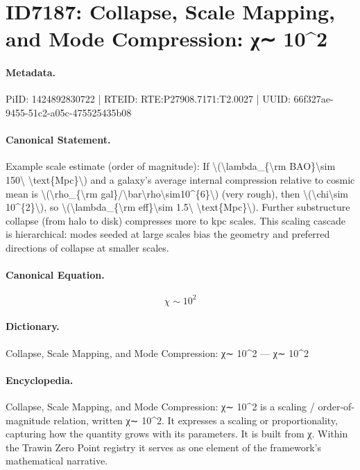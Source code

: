 \section*{ID7187: Collapse, Scale Mapping, and Mode Compression: χ∼ 10\textasciicircum{}2}
\paragraph{Metadata.}
PiID: 1424892830722 | RTEID: RTE:P27908.7171:T2.0027 | UUID: 66f327ae-9455-51c2-a05c-475525435b08

\paragraph{Canonical Statement.}
Example scale estimate (order of magnitude): If \textbackslash{}(\textbackslash{}lambda\_\{\textbackslash{}rm BAO\}\textbackslash{}sim 150\textbackslash{} \textbackslash{}text\{Mpc\}\textbackslash{}) and a galaxy's average internal compression relative to cosmic mean is \textbackslash{}(\textbackslash{}rho\_\{\textbackslash{}rm gal\}/\textbackslash{}bar\textbackslash{}rho\textbackslash{}sim10\textasciicircum{}\{6\}\textbackslash{}) (very rough), then \textbackslash{}(\textbackslash{}chi\textbackslash{}sim 10\textasciicircum{}\{2\}\textbackslash{}), so \textbackslash{}(\textbackslash{}lambda\_\{\textbackslash{}rm eff\}\textbackslash{}sim 1.5\textbackslash{} \textbackslash{}text\{Mpc\}\textbackslash{}). Further substructure collapse (from halo to disk) compresses more to kpc scales. This scaling cascade is hierarchical: modes seeded at large scales bias the geometry and preferred directions of collapse at smaller scales.

\paragraph{Canonical Equation.}
\[
\chi\sim 10^{2}
\]

\paragraph{Dictionary.}
Collapse, Scale Mapping, and Mode Compression: χ∼ 10\textasciicircum{}2 — χ∼ 10\textasciicircum{}2

\paragraph{Encyclopedia.}
Collapse, Scale Mapping, and Mode Compression: χ∼ 10\textasciicircum{}2 is a scaling / order-of-magnitude relation, written χ∼ 10\textasciicircum{}2. It expresses a scaling or proportionality, capturing how the quantity grows with its parameters. It is built from χ. Within the Trawin Zero Point registry it serves as one element of the framework's mathematical narrative.
